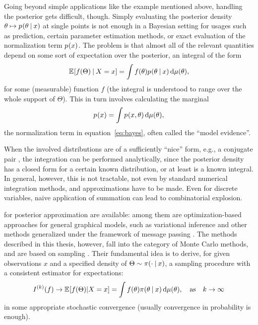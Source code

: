 Going beyond simple applications like the example mentioned above, hand\-ling the posterior gets
difficult, though.  Simply evaluating the posterior density
\(\theta \mapsto \prob{\theta \given x}\) at single points is not enough in a Bayesian setting for
usages such as prediction, certain parameter estimation methods, or exact evaluation of the
normalization term \(\prob{x}\).  The problem is that almost all of the relevant quantities depend
on some sort of expectation over the posterior, an integral of the form
\begin{equation}
  \label{eq:posterior-expectation}
  \Exp{f(\Theta) \given X = x} = \int f(\theta) \prob{\theta \given x} \dif \mu(\theta),
\end{equation}
for some (measurable) function \(f\) (the integral is understood to range over the whole support of
\(\Theta\)). This in turn involves calculating the marginal
\begin{equation}
  \label{eq:normalizing}
  \prob{x} = \int \prob{x, \theta} \dif \mu(\theta),
\end{equation}
the normalization term in equation~\eqref{eq:bayes}, often called the \enquote{model evidence}.

When the involved distributions are of a sufficiently \enquote{nice} form, e.g., a conjugate pair
\parencites[see][chapter 2.2.2]{marin2007bayesian}[chapter 9.2.5]{murphy2012machine}, the
integration can be performed analytically, since the posterior density has a closed form for a
certain known distribution, or at least is a known integral.  In general, however, this is not
tractable, not even by standard numerical integration methods, and approximations have to be made.
Even for discrete variables, naive application of summation can lead to combinatorial explosion.

 for posterior approximation are available: among them are
optimization-based approaches for general graphical models, such as variational inference
\parencite[chapter 21 and 22]{murphy2012machine} and other methods generalized under the framework
of message passing \parencite{minka2005divergence}.  The methods described in this thesis, however,
fall into the category of Monte Carlo methods, and are based on sampling \parencites[chapter
23]{murphy2012machine}{vihola2020lectures}.  Their fundamental idea is to derive, for given
observations \(x\) and a specified density of \(\Theta \sim \pi(\cdot \:\vert\: x)\), a sampling
procedure with a consistent estimator for expectations:
\begin{equation}
  \label{eq:mc-methods}
  \kth{I}(f) \to \Exp{f(\Theta) | X = x} = \int f(\theta) \pi(\theta \given x) \dif\mu(\theta), \quad \text{as} \quad k
  \to \infty
\end{equation}
in some appropriate stochastic convergence (usually convergence in probability is enough).

